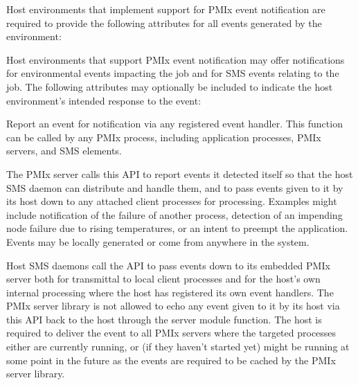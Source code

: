 
\divider

Host environments that implement support for \ac{PMIx} event notification are required to provide the following attributes for all events generated by the environment:


\reqattrend

\optattrstart
Host environments that support \ac{PMIx} event notification may offer notifications for environmental events impacting the job and for \ac{SMS} events relating to the job. The following attributes may optionally be included to indicate the host environment's intended response to the event:


\optattrend

\descr

Report an event for notification via any registered event handler. This function can be called by any \ac{PMIx} process, including application processes, \ac{PMIx} servers, and \ac{SMS} elements. 

The \ac{PMIx} server calls this \ac{API} to report events it detected itself so that the host \ac{SMS} daemon can distribute and handle them, and to pass events given to it by its host down to any attached client processes for processing. Examples might include notification of the failure of another process, detection of an impending node failure due to rising temperatures, or an intent to preempt the application. Events may be locally generated or come from anywhere in the system.

Host \ac{SMS} daemons call the \ac{API} to pass events down to its embedded \ac{PMIx} server both for transmittal to local client processes and for the host's own internal processing where the host has registered its own event handlers. The \ac{PMIx} server library is not allowed to echo any event given to it by its host via this \ac{API} back to the host through the  server module function. The host is required to deliver the event to all \ac{PMIx} servers where the targeted processes either are currently running, or (if they haven't started yet) might be running at some point in the future as the events are required to be cached by the \ac{PMIx} server library.

